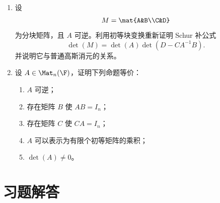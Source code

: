 \begin{enumerate}[label=\arabic*.,start=51]
  \item \hard 设
  \[
  M=\mat{A&B\\C&D}
  \]
  为分块矩阵，且 $A$ 可逆。利用初等块变换重新证明 Schur 补公式
  \[
  \det(M)=\det(A)\det(D-CA^{-1}B).
  \]
  并说明它与普通高斯消元的关系。

  \item \hard 设 $A\in\Mat_n(\F)$，证明下列命题等价：
  \begin{enumerate}[label=(\alph*)]
    \item $A$ 可逆；
    \item 存在矩阵 $B$ 使 $AB=I_n$；
    \item 存在矩阵 $C$ 使 $CA=I_n$；
    \item $A$ 可以表示为有限个初等矩阵的乘积；
    \item $\det(A)\ne0$。
  \end{enumerate}
\end{enumerate}

\section*{习题解答}

